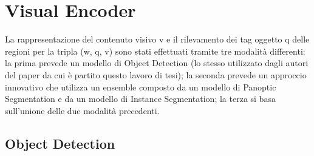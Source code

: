 \section{Visual Encoder}\label{visual_encoder}
La rappresentazione del contenuto visivo v e il rilevamento dei tag oggetto q delle regioni per la tripla (w, q, v) sono stati effettuati tramite tre modalità differenti: la prima prevede un modello di Object Detection (lo stesso utilizzato dagli autori del paper \cite{zhang2021vinvl} da cui è partito questo lavoro di tesi); la seconda prevede un approccio innovativo che utilizza un ensemble composto da un modello di Panoptic Segmentation e da un modello di Instance Segmentation; la terza si basa sull'unione delle due modalità precedenti.

\subsection{Object Detection}\label{object_detection}

